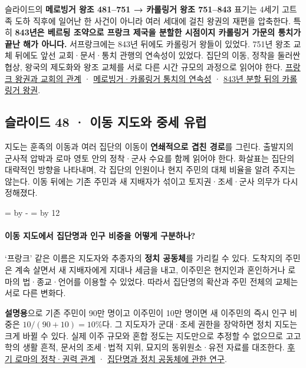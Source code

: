 \documentclass[10pt,a4paper]{article}
\newcommand{\ReserveQuestionSpace}{%
  \par\begingroup
  \dimen0=\pagegoal \advance\dimen0 by -\pagetotal
  \dimen2=\baselineskip \multiply\dimen2 by 12
  \ifdim\dimen0<\dimen2 \newpage\fi
  \endgroup}
\begin{document}
슬라이드의 \textbf{메로빙거 왕조 481–751 → 카롤링거 왕조 751–843} 표기는 4세기 고트족 도하 직후에 일어난 한 사건이 아니라 여러 세대에 걸친 왕권의 재편을 압축한다. 특히 \textbf{843년은 베르됭 조약으로 프랑크 제국을 분할한 시점이지 카롤링거 가문의 통치가 끝난 해가 아니다.} 서프랑크에는 843년 뒤에도 카롤링거 왕들이 있었다. 751년 왕조 교체 뒤에도 앞선 교회·문서·통치 관행의 연속성이 있었다. 집단의 이동, 정착을 둘러싼 협상, 왕국의 제도화와 왕조 교체를 서로 다른 시간 규모의 과정으로 읽어야 한다. \href{https://www.cambridge.org/core/journals/studies-in-church-history/article/roman-army-and-the-conversion-of-northern-britain/2069870E2EE16EB6497BAAD7AF5E36E7}{프랑크 왕권과 교회의 관계} · \href{https://www.cambridge.org/core/books/abs/politics-and-power-in-early-medieval-europe/late-merovingian-order/1A586658417F5E1ED91E714DF174C39E}{메로빙거·카롤링거 통치의 연속성} · \href{https://assets.cambridge.org/97813165/10391/excerpt/9781316510391\_excerpt.pdf}{843년 분할 뒤의 카롤링거 왕권}.\par

\subsection{슬라이드 48 · 이동 지도와 중세 유럽}
지도는 훈족의 이동과 여러 집단의 이동이 \textbf{연쇄적으로 겹친 경로}를 그린다. 출발지의 군사적 압박과 로마 영토 안의 정착·군사 수요를 함께 읽어야 한다. 화살표는 집단의 대략적인 방향을 나타내며, 각 집단의 인원이나 현지 주민의 대체 비율을 알려 주지는 않는다. 이동 뒤에는 기존 주민과 새 지배자가 섞이고 토지권·조세·군사 의무가 다시 정해졌다.\par

\ReserveQuestionSpace
\paragraph{이동 지도에서 집단명과 인구 비중을 어떻게 구분하나?}
‘프랑크’ 같은 이름은 지도자와 추종자의 \textbf{정치 공동체}를 가리킬 수 있다. 도착지의 주민은 계속 살면서 새 지배자에게 지대나 세금을 내고, 이주민은 현지인과 혼인하거나 로마의 법·종교·언어를 이용할 수 있었다. 따라서 집단명의 확산과 주민 전체의 교체는 서로 다른 변화다.\par

\textbf{설명용}으로 기존 주민이 90만 명이고 이주민이 10만 명이면 새 이주민의 즉시 인구 비중은 $10/(90+10)=10\%$다. 그 지도자가 군대·조세 권한을 장악하면 정치 지도는 크게 바뀔 수 있다. 실제 이주 규모와 혼합 정도는 지도만으로 추정할 수 없으므로 고고학의 생활 흔적, 문서의 조세·법적 지위, 묘지의 동위원소·유전 자료를 대조한다. \href{https://www.cambridge.org/core/books/cambridge-companion-to-the-age-of-attila/reversals-of-fortune-an-overview-of-the-age-of-attila/9F92FDDA3711527E2E1F8CBE681ECCCA}{후기 로마의 정착·권력 관계} · \href{https://www.cambridge.org/core/books/serving-the-christian-state-in-late-antiquity/confession-and-conformity-in-east-and-west/9178287330EE536C019C4799F8733825}{집단명과 정치 공동체에 관한 연구}.\par
\end{document}
